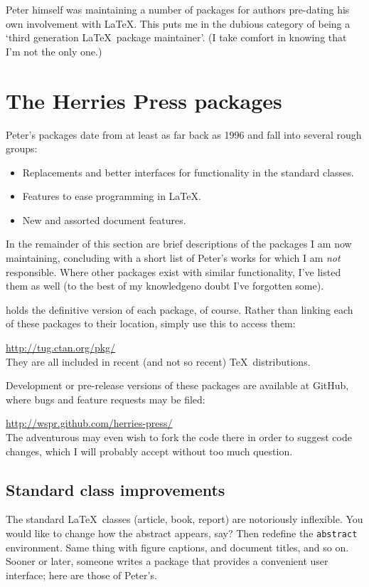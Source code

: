 \documentclass[final]{ltugboat}
\begin{document}
Peter himself was maintaining a number of packages for authors pre-dating his own involvement with \LaTeX. This puts me in the dubious category of being a `third generation \LaTeX\ package maintainer'. (I take comfort in knowing that I'm not the only one.)

\section{The Herries Press packages}

Peter's packages date from at least as far back as 1996 and fall into several rough groups:
\begin{itemize}
\item Replacements and better interfaces for functionality in the standard classes.
\item Features to ease programming in \LaTeX.
\item New and assorted document features.
\end{itemize}
In the remainder of this section are brief descriptions of the packages I am now maintaining, concluding with a short list of Peter's works for which I am \emph{not} responsible. Where other packages exist with similar functionality, I've listed them as well (to the best of my knowledge\Dash no doubt I've forgotten some).

 holds the definitive version of each package, of course. Rather than linking each of these packages to their  location, simply use this  to access them:\par
\url{http://tug.ctan.org/pkg/}\\
They are all included in recent (and not so recent) \TeX\ distributions.

Development or pre-release versions of these packages are available at GitHub, where bugs and feature requests may be filed:\par
\url{http://wspr.github.com/herries-press/}\\
The adventurous may even wish to fork the code there in order to suggest code changes, which I will probably accept without too much question.

\subsection{Standard class improvements}

The standard \LaTeX\ classes (\textsf{article}, \textsf{book}, \textsf{report}) are notoriously inflexible. You would like to change how the abstract appears, say? Then redefine the \texttt{abstract} environment. Same thing with figure captions, and document titles, and so on. Sooner or later, someone writes a package that provides a convenient user interface; here are those of Peter's.
\end{document}
